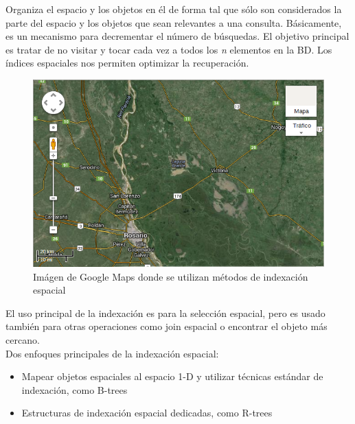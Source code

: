\documentclass[a4paper,12pt,oneside]{report}
\begin{document}
Organiza el espacio y los objetos en \'el de forma tal que s\'olo son considerados la parte del espacio y los objetos que sean relevantes a una consulta. B\'asicamente, es un mecanismo para decrementar el n\'umero de b\'usquedas. El objetivo principal es tratar de no visitar y tocar cada vez a todos los \textit{n} elementos en la BD. Los \'indices espaciales nos permiten optimizar la recuperaci\'on.\\

\begin{figure}[h]
\center
\includegraphics[scale=0.5]{Imagenes/6.png}
\caption{Im\'agen de Google Maps donde se utilizan m\'etodos de indexaci\'on espacial}
\end{figure}
\noindent El uso principal de la indexaci\'on es para la selecci\'on espacial, pero es usado tambi\'en para otras operaciones como join espacial o encontrar el objeto m\'as cercano.\\
Dos enfoques principales de la indexaci\'on espacial:
\begin{itemize}
\item Mapear objetos espaciales al espacio 1-D y utilizar t\'ecnicas est\'andar de indexaci\'on, como B-trees
\item Estructuras de indexaci\'on espacial dedicadas, como R-trees
\end{itemize}
\end{document}
